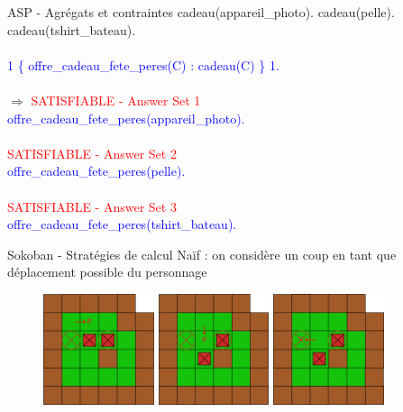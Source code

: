 \documentclass{beamer}
\begin{document}
\begin{frame}{ASP - Agrégats et contraintes}
	cadeau(appareil\_photo). cadeau(pelle). cadeau(tshirt\_bateau).\\
	\pause
	\textcolor{white}{cheatcode}\\
	\textcolor{blue}{1 \{ offre\_cadeau\_fete\_peres(C) : cadeau(C) \} 1.\\}
	\pause
	\textcolor{white}{cheatcode}\\
	$\Rightarrow$ \textcolor{red}{SATISFIABLE - Answer Set 1\\}
		      \textcolor{blue}{offre\_cadeau\_fete\_peres(appareil\_photo).}\\
		      \textcolor{white}{cheatcode}\\
		      \pause
		      \textcolor{red}{SATISFIABLE - Answer Set 2\\}
		      \textcolor{blue}{offre\_cadeau\_fete\_peres(pelle).}\\
		      \textcolor{white}{cheatcode}\\
		      \pause
		      \textcolor{red}{SATISFIABLE - Answer Set 3\\}
		      \textcolor{blue}{offre\_cadeau\_fete\_peres(tshirt\_bateau).}
\end{frame}


\begin{frame}{Sokoban - Stratégies de calcul}
	\pause
	Naïf : on considère un coup en tant que déplacement possible du personnage
	\begin{figure}[!h]
		\pause
		\includegraphics[width=3.25cm]{Coup1_strat1.eps}
		\pause
		\includegraphics[width=3.25cm]{Coup2_strat1.eps}
		\pause
		\includegraphics[width=3.25cm]{Coup3_strat1.eps}
	\end{figure}
\end{frame}
\end{document}
